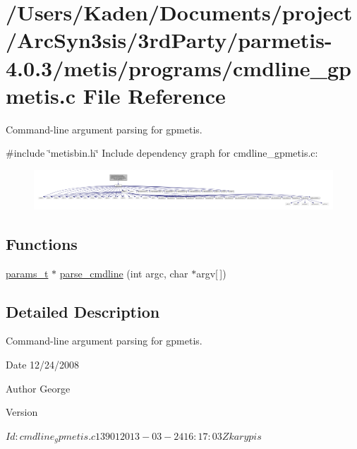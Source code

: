 \hypertarget{a00296}{}\section{/\+Users/\+Kaden/\+Documents/project/\+Arc\+Syn3sis/3rd\+Party/parmetis-\/4.0.3/metis/programs/cmdline\+\_\+gpmetis.c File Reference}
\label{a00296}


Command-\/line argument parsing for gpmetis.  


{\ttfamily \#include \char`\"{}metisbin.\+h\char`\"{}}\newline
Include dependency graph for cmdline\+\_\+gpmetis.\+c\+:\nopagebreak
\begin{figure}[H]
\begin{center}
\leavevmode
\includegraphics[width=350pt]{a00297}
\end{center}
\end{figure}
\subsection*{Functions}
\begin{DoxyCompactItemize}
\item 
\hyperlink{a00706}{params\+\_\+t} $\ast$ \hyperlink{a00296_a0e7ce196a2f8882777957bf898739f6f}{parse\+\_\+cmdline} (int argc, char $\ast$argv\mbox{[}$\,$\mbox{]})
\end{DoxyCompactItemize}


\subsection{Detailed Description}
Command-\/line argument parsing for gpmetis. 

\begin{DoxyDate}{Date}
12/24/2008 
\end{DoxyDate}
\begin{DoxyAuthor}{Author}
George 
\end{DoxyAuthor}
\begin{DoxyVersion}{Version}
\begin{DoxyVerb}$Id: cmdline_gpmetis.c 13901 2013-03-24 16:17:03Z karypis $\end{DoxyVerb}
 
\end{DoxyVersion}


